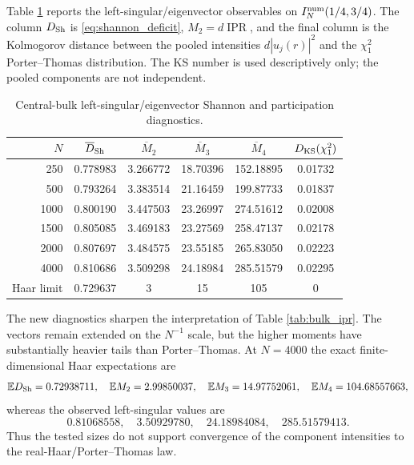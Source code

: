 \documentclass[11pt]{amsart}
\numberwithin{equation}{section}
\theoremstyle{plain}
\theoremstyle{definition}
\theoremstyle{remark}
\newcommand{\IPR}{\operatorname{IPR}}
\begin{document}
Table \ref{tab:shannon_left_bulk} reports the left-singular/eigenvector observables on $I_N^{\rm num}(1/4,3/4)$.  The column $D_{\rm Sh}$ is \eqref{eq:shannon_deficit}, $M_2=d\IPR$, and the final column is the Kolmogorov distance between the pooled intensities $d|u_j(r)|^2$ and the $\chi_1^2$ Porter--Thomas distribution.  The KS number is used descriptively only; the pooled components are not independent.

\begin{table}[htbp]
\centering
\caption{Central-bulk left-singular/eigenvector Shannon and participation diagnostics.}
\label{tab:shannon_left_bulk}
\begin{tabular}{rccccc}
\toprule
$N$ & $\overline D_{\rm Sh}$ & $\overline M_2$ & $\overline M_3$ & $\overline M_4$ & $D_{\rm KS}(\chi_1^2)$\\
\midrule
250  & 0.778983 & 3.266772 & 18.70396 & 152.18895 & 0.01732\\
500  & 0.793264 & 3.383514 & 21.16459 & 199.87733 & 0.01837\\
1000 & 0.800190 & 3.447503 & 23.26997 & 274.51612 & 0.02008\\
1500 & 0.805085 & 3.469183 & 23.27569 & 258.47137 & 0.02178\\
2000 & 0.807697 & 3.484575 & 23.55185 & 265.83050 & 0.02223\\
4000 & 0.810686 & 3.509298 & 24.18984 & 285.51579 & 0.02295\\
\midrule
Haar limit & 0.729637 & 3 & 15 & 105 & 0\\
\bottomrule
\end{tabular}
\end{table}

The new diagnostics sharpen the interpretation of Table \ref{tab:bulk_ipr}.  The vectors remain extended on the $N^{-1}$ scale, but the higher moments have substantially heavier tails than Porter--Thomas.  At $N=4000$ the exact finite-dimensional Haar expectations are
\begin{equation}
\mathbb E D_{\rm Sh}=0.72938711,
\quad
\mathbb E M_2=2.99850037,
\quad
\mathbb E M_3=14.97752061,
\quad
\mathbb E M_4=104.68557663,
\label{eq:haar_bench_N4000}
\end{equation}
whereas the observed left-singular values are
\begin{equation}
0.81068558,
\quad
3.50929780,
\quad
24.18984084,
\quad
285.51579413.
\label{eq:observed_bench_N4000}
\end{equation}
Thus the tested sizes do not support convergence of the component intensities to the real-Haar/Porter--Thomas law.
\end{document}
